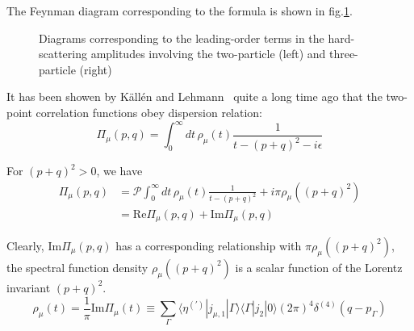 The Feynman diagram corresponding to the formula is shown in fig.\ref{fig:feynman1}.

\begin{figure}[!hpt]\centering
    \caption{Diagrams corresponding to the leading-order terms in the hard-scattering amplitudes
        involving the two-particle (left) and three-particle (right)}
    \label{fig:feynman1}
\end{figure}

It has been showen by Källén and Lehmann~\cite{Kallen1952, Lehmann1954} quite a long time ago that the two-point correlation functions obey dispersion relation:
\begin{equation}
    \Pi_\mu(p, q)= \int_{0}^{\infty} dt\, \rho_{\mu}(t)\frac{1}{t-(p+q)^{2}-i\epsilon}
\end{equation}

For $(p+q)^{2}>0$, we have
\begin{equation}
    \begin{array}{rl}
        \Pi_\mu(p, q) & = \mathcal{P} \int_{0}^{\infty} dt\, \rho_{\mu}(t)\frac{1}{t-(p+q)^{2}} + i\pi\rho_{\mu}((p+q)^{2}) \\
                      & = \mathrm{Re}\Pi_\mu(p, q) + \mathrm{Im}\Pi_\mu(p, q)
    \end{array}
    \label{eq:dispersion_relation_real}
\end{equation}

Clearly, $\mathrm{Im}\Pi_\mu(p, q)$ has a corresponding relationship with $\pi\rho_{\mu}((p+q)^{2})$, the spectral function density $\rho_{\mu}((p+q)^{2})$ is a scalar function of the Lorentz invariant $(p+q)^{2}$.
\begin{equation}
    \rho_{\mu}(t) = \frac{1}{\pi} \mathrm{Im}\Pi_\mu(t) \equiv \sum_{\Gamma}^{} \langle \eta^{(\prime)}|j_{\mu,1}|\Gamma\rangle \langle \Gamma|j_{2}|0\rangle (2 \pi)^4 \delta^{(4)}\left(q-p_{\Gamma}\right)
\end{equation}

